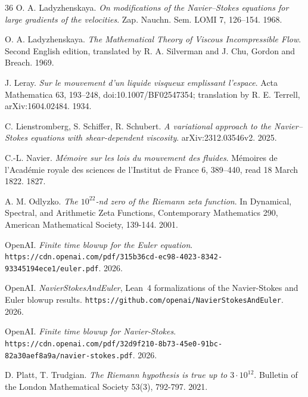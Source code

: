 \begin{thebibliography}{36}
O. A. Ladyzhenskaya. \emph{On modifications of the Navier--Stokes equations for large gradients of the velocities}. Zap. Nauchn. Sem. LOMI 7, 126--154. 1968.

O. A. Ladyzhenskaya. \emph{The Mathematical Theory of Viscous Incompressible Flow}. Second English edition, translated by R. A. Silverman and J. Chu, Gordon and Breach. 1969.

J. Leray. \emph{Sur le mouvement d'un liquide visqueux emplissant l'espace}. Acta Mathematica 63, 193--248, doi:10.1007/BF02547354; translation by R. E. Terrell, arXiv:1604.02484. 1934.

C. Lienstromberg, S. Schiffer, R. Schubert. \emph{A variational approach to the Navier--Stokes equations with shear-dependent viscosity}. arXiv:2312.03546v2. 2025.

C.-L. Navier. \emph{M\'emoire sur les lois du mouvement des fluides}. M\'emoires de l'Acad\'emie royale des sciences de l'Institut de France 6, 389--440, read 18 March 1822. 1827.

A. M. Odlyzko. \emph{The $10^{22}$-nd zero of the Riemann zeta function}. In Dynamical, Spectral, and Arithmetic Zeta Functions, Contemporary Mathematics 290, American Mathematical Society, 139-144. 2001.

OpenAI. \emph{Finite time blowup for the Euler equation}. \texttt{https:/\allowbreak{}/\allowbreak{}cdn.openai.com/\allowbreak{}pdf/\allowbreak{}315b36cd-ec98-4023-8342-93345194ece1/\allowbreak{}euler.pdf}. 2026.

OpenAI. \emph{NavierStokesAndEuler}, Lean~4 formalizations of the Navier-Stokes and Euler blowup results. \texttt{https:/\allowbreak{}/\allowbreak{}github.com/\allowbreak{}openai/\allowbreak{}NavierStokesAndEuler}. 2026.

OpenAI. \emph{Finite time blowup for Navier-Stokes}. \texttt{https:/\allowbreak{}/\allowbreak{}cdn.openai.com/\allowbreak{}pdf/\allowbreak{}32d9f210-8b73-45e0-91bc-82a30aef8a9a/\allowbreak{}navier-stokes.pdf}. 2026.

D. Platt, T. Trudgian. \emph{The Riemann hypothesis is true up to $3\cdot 10^{12}$}. Bulletin of the London Mathematical Society 53(3), 792-797. 2021.


\end{thebibliography}
